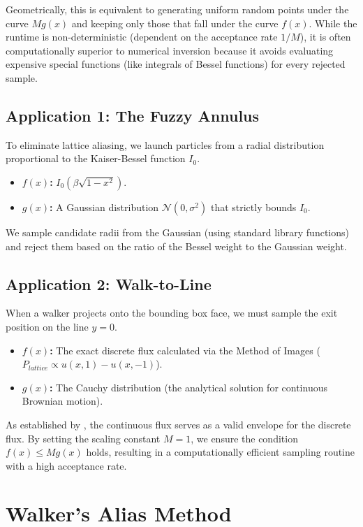 \documentclass[12pt, a4paper, oneside]{report}
\theoremstyle{remark}
\begin{document}
Geometrically, this is equivalent to generating uniform random points under the curve $M g(x)$ and keeping only those that fall under the curve $f(x)$. While the runtime is non-deterministic (dependent on the acceptance rate $1/M$), it is often computationally superior to numerical inversion because it avoids evaluating expensive special functions (like integrals of Bessel functions) for every rejected sample.

\subsection{Application 1: The Fuzzy Annulus}
To eliminate lattice aliasing, we launch particles from a radial distribution proportional to the Kaiser-Bessel function $I_0$.
\begin{itemize}
    \item \textbf{$f(x)$:} $I_0(\beta \sqrt{1-x^2})$.
    \item \textbf{$g(x)$:} A Gaussian distribution $\mathcal{N}(0, \sigma^2)$ that strictly bounds $I_0$.
\end{itemize}
We sample candidate radii from the Gaussian (using standard library functions) and reject them based on the ratio of the Bessel weight to the Gaussian weight.

\subsection{Application 2: Walk-to-Line}
When a walker projects onto the bounding box face, we must sample the exit position on the line $y=0$.
\begin{itemize}
    \item \textbf{$f(x)$:} The exact discrete flux calculated via the Method of Images ($P_{lattice} \propto u(x, 1) - u(x, -1)$).
    \item \textbf{$g(x)$:} The Cauchy distribution (the analytical solution for continuous Brownian motion).
\end{itemize}
As established by \citet{Loh2014}, the continuous flux serves as a valid envelope for the discrete flux. By setting the scaling constant $M = 1$, we ensure the condition $f(x) \le M g(x)$ holds, resulting in a computationally efficient sampling routine with a high acceptance rate.

\section{Walker's Alias Method}
\label{app:alias_method}
\end{document}
